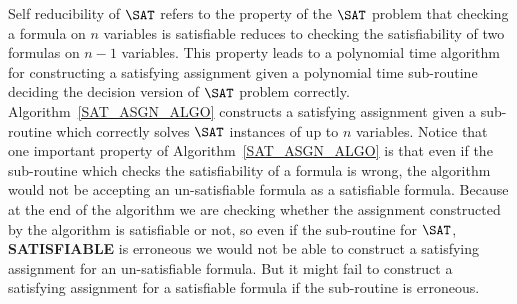 Self reducibility of $\SAT$ refers to the property of the $\SAT$
problem that checking a formula on $n$ variables is satisfiable
reduces to checking the satisfiability of two formulas on $n-1$
variables. This property leads to a polynomial time algorithm for
constructing a satisfying assignment given a polynomial time
sub-routine deciding the decision version of $\SAT$ problem
correctly. Algorithm~\ref{SAT_ASGN_ALGO} constructs a satisfying
assignment given a sub-routine which correctly solves $\SAT$ instances
of up to $n$ variables. Notice that one important property of
Algorithm~\ref{SAT_ASGN_ALGO} is that even if the sub-routine which
checks the satisfiability of a formula is wrong, the algorithm would
not be accepting an un-satisfiable formula as a satisfiable
formula. Because at the end of the algorithm we are checking whether
the assignment constructed by the algorithm is satisfiable or not, so
even if the sub-routine for $\SAT$, \textbf{SATISFIABLE} is
erroneous we would not be able to construct a satisfying assignment
for an un-satisfiable formula. But it might fail to construct a
satisfying assignment for a satisfiable formula if the sub-routine is
erroneous.


